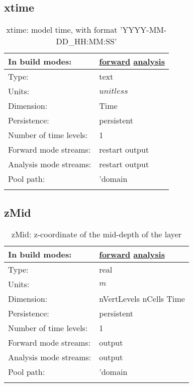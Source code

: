\subsection[xtime]{xtime}
\label{subsec:var_sec_diagnostics_xtime}
\begin{center}
\begin{longtable}{| p{2.0in} | p{4.0in} |}
        \hline 
        In build modes: & \hyperref[subsec:forward_var_tab_diagnostics]{forward} \hyperref[subsec:analysis_var_tab_diagnostics]{analysis} \\
        \hline 
        Type: & text \\
        \hline 
        Units: & $unitless$ \\
        \hline 
        Dimension: & Time \\
        \hline 
        Persistence: & persistent \\
        \hline 
        Number of time levels: & 1 \\
        \hline 
		 Forward mode streams: &  restart output \\
        \hline 
		 Analysis mode streams: &  restart output \\
        \hline 
            Pool path: & 'domain %
 \\
		 \hline 
    \caption{xtime: model time, with format 'YYYY-MM-DD\_HH:MM:SS'}
\end{longtable}
\end{center}
\subsection[zMid]{zMid}
\label{subsec:var_sec_diagnostics_zMid}
\begin{center}
\begin{longtable}{| p{2.0in} | p{4.0in} |}
        \hline 
        In build modes: & \hyperref[subsec:forward_var_tab_diagnostics]{forward} \hyperref[subsec:analysis_var_tab_diagnostics]{analysis} \\
        \hline 
        Type: & real \\
        \hline 
        Units: & $m$ \\
        \hline 
        Dimension: & nVertLevels nCells Time \\
        \hline 
        Persistence: & persistent \\
        \hline 
        Number of time levels: & 1 \\
        \hline 
		 Forward mode streams: &  output \\
        \hline 
		 Analysis mode streams: &  output \\
        \hline 
            Pool path: & 'domain %
 \\
		 \hline 
    \caption{zMid: z-coordinate of the mid-depth of the layer}
\end{longtable}
\end{center}

